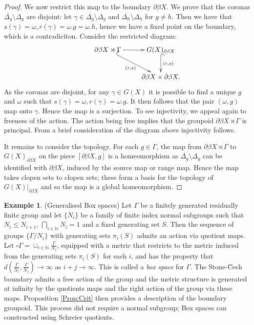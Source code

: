 \documentclass[11pt]{amsart}
\theoremstyle{plain}
\theoremstyle{definition}%
\newtheorem{example}[theorem]{Example}%
\theoremstyle{remark}%
\begin{document}
\begin{proof}
We now restrict this map to the boundary $\partial\beta X$. We prove that the coronas $\overline{\Delta_{g}}\setminus \Delta_{g}$ are disjoint: let $\gamma \in \overline{\Delta_{g}}\setminus \Delta_{g}$ and $\overline{\Delta_{h}}\setminus \Delta_{h}$ for $g \not = h$. Then we have that $s(\gamma)=\omega, r(\gamma)=\omega.g=\omega.h$, hence we have a fixed point on the boundary, which is a contradiciton. Consider the restricted diagram:
\begin{equation*}
\xymatrix{
& \partial\beta X \rtimes \Gamma \ar@{^{(}->}[rd]_{(r,s)} \ar[r] & G(X)_{\partial\beta X} \ar@{^{(}->}[d]^{(r,s)}\\ & & \partial\beta X \times \partial\beta X.
}
\end{equation*}
As the coronas are disjoint, for any $\gamma \in G(X)$ it is possible to find a unique $g$ and $\omega$ such that $s(\gamma)=\omega, r(\gamma)=\omega.g$. It then follows that the pair $(\omega,g)$ map onto $\gamma$. Hence the map is a surjection. To see injectivity, we appeal again to freeness of the action. The action being free implies that the groupoid $\partial\beta X \rtimes \Gamma$ is principal. From a brief consideration of the diagram above injectivity follows.

It remains to consider the topology. For each $g\in \Gamma$, the map from $\partial \beta X \rtimes \Gamma$ to $G(X)_{\partial\beta X}$ on the piece $[\partial\beta X,g]$ is a homeomorphism as $\overline{\Delta_{g}}\setminus\Delta_{g}$ can be identified with $\partial\beta X$, induced by the source map or range map. Hence the map takes clopen sets to clopen sets; these form a basis for the topology of $G(X)|_{\partial\beta X}$ and so the map is a global homeomorphism.
\end{proof}

\begin{example}(Generalised Box spaces)
Let $\Gamma$ be a finitely generated residually finite group and let $\lbrace N_{i}\rbrace$ be a family of finite index normal subgroups such that $N_{i}\leq N_{i+1}$, $\bigcap_{i \in \mathbb{N}}N_{i}=1$ and a fixed generating set $S$. Then the sequence of groups $\lbrace \Gamma/N_{i}\rbrace$ with generating sets $\pi_{i}(S)$ admits an action via quotient maps. Let $\square\Gamma= \sqcup_{i \in \mathbb{N}}\frac{\Gamma}{N_{i}}$, equipped with a metric that restricts to the metric induced from the generating sets $\pi_{i}(S)$ for each $i$, and has the property that $d(\frac{\Gamma}{N_{i}},\frac{\Gamma}{N_{j}})\rightarrow \infty$ as $i+j \rightarrow \infty$. This is called a \textit{box space} for $\Gamma$. The Stone-\u{C}ech boundary admits a free action of the group and the metric structure is generated at infinity by the quotients maps and the right action of the group via these maps. Proposition \ref{Prop:Crit} then provides a description of the boundary groupoid. This process did not require a normal subgroup; Box spaces can constructed using Schreier quotients.
\end{example}
\end{document}
